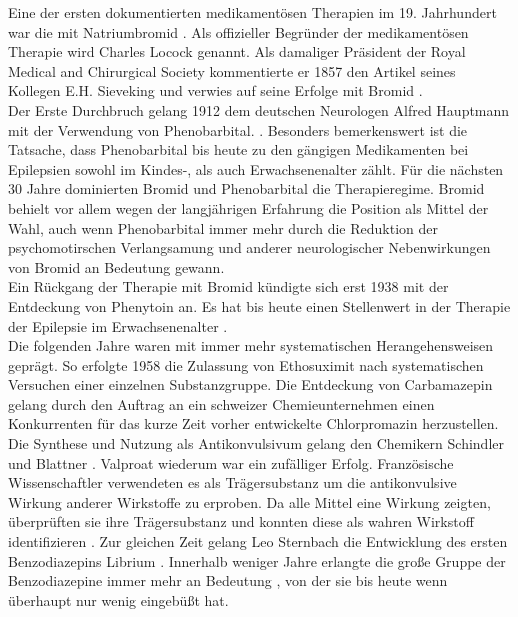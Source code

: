 \documentclass[a4paper,11pt]{report}
\begin{document}
Eine der ersten dokumentierten medikamentösen Therapien im 19. Jahrhundert war die mit Natriumbromid {\cite{OConnor.1857}\cite{ToddRobertBentley18091860.}. Als offizieller Begründer der medikamentösen Therapie wird Charles Locock genannt\cite{Brodie.2010}. Als damaliger Präsident der Royal Medical and Chirurgical Society kommentierte er 1857 den Artikel seines Kollegen E.H. Sieveking \cite{Sieveking.1857} und verwies auf seine Erfolge mit Bromid \cite{Eadie.2012}.\\
Der Erste Durchbruch gelang 1912 dem deutschen Neurologen Alfred Hauptmann mit der Verwendung von Phenobarbital. \cite{Hauptmann.1912}. Besonders bemerkenswert ist die Tatsache, dass Phenobarbital bis heute zu den gängigen Medikamenten bei Epilepsien sowohl im Kindes-, als auch Erwachsenenalter zählt.\cite{DGN.2017} Für die nächsten 30 Jahre dominierten Bromid und Phenobarbital die Therapieregime. Bromid behielt vor allem wegen der langjährigen Erfahrung die Position als Mittel der Wahl, auch wenn Phenobarbital immer mehr durch die Reduktion der psychomotirschen Verlangsamung und anderer neurologischer Nebenwirkungen von Bromid an Bedeutung gewann. \cite{Yasiry.2012}\\
Ein Rückgang der Therapie mit Bromid kündigte sich erst 1938 mit der Entdeckung von Phenytoin \cite{Merritt.1938}an. Es hat bis heute einen Stellenwert in der Therapie der Epilepsie im Erwachsenenalter \cite{DGN.2017}.\\
Die folgenden Jahre waren mit immer mehr systematischen Herangehensweisen geprägt.  So erfolgte 1958 die Zulassung von Ethosuximit \cite{Kenneth.1961} nach systematischen Versuchen einer einzelnen Substanzgruppe. Die Entdeckung von Carbamazepin gelang durch den Auftrag an ein schweizer Chemieunternehmen einen Konkurrenten für das kurze Zeit vorher entwickelte Chlorpromazin herzustellen. Die Synthese und Nutzung als Antikonvulsivum gelang den Chemikern Schindler und Blattner \cite{Schindler.1961}. Valproat wiederum war ein zufälliger Erfolg. Französische Wissenschaftler verwendeten es als Trägersubstanz um die antikonvulsive Wirkung anderer Wirkstoffe zu erproben. Da alle Mittel eine Wirkung zeigten, überprüften sie ihre Trägersubstanz und konnten diese als wahren Wirkstoff identifizieren \cite{MEUNIER.1963}. Zur gleichen Zeit gelang Leo Sternbach die Entwicklung des ersten Benzodiazepins Librium \cite{Sternbach.1965}. Innerhalb weniger Jahre erlangte die große Gruppe der Benzodiazepine immer mehr an Bedeutung \cite{BROWNE.1973}, von der sie bis heute wenn überhaupt nur wenig eingebüßt hat. \\
}
\end{document}
